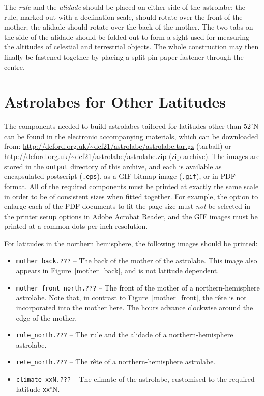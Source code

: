 \documentclass[a4paper,onecolumn,10pt]{article}
\begin{document}
The {\it rule} and the {\it alidade} should be placed on either side of the
astrolabe: the rule, marked out with a declination scale, should rotate over
the front of the mother; the alidade should rotate over the back of the mother.
The two tabs on the side of the alidade should be folded out to form a sight
used for measuring the altitudes of celestial and terrestrial objects.  The
whole construction may then finally be fastened together by placing a split-pin
paper fastener through the centre.

\section*{Astrolabes for Other Latitudes}

The components needed to build astrolabes tailored for latitudes other than
$52^\circ$N can be found in the electronic accompanying materials, which can be
downloaded from:
\newline\noindent\url{http://dcford.org.uk/~dcf21/astrolabe/astrolabe.tar.gz}
(tarball)
\newline\noindent or
\newline\noindent\url{http://dcford.org.uk/~dcf21/astrolabe/astrolabe.zip} (zip
archive).
\newline\noindent The images are stored in the {\tt output} directory of this
archive, and each is available as encapsulated postscript ({\tt .eps}), as a
GIF bitmap image ({\tt .gif}), or in PDF format.  All of the required
components must be printed at exactly the same scale in order to be of
consistent sizes when fitted together. For example, the option to enlarge each
of the PDF documents to fit the page size must {\it not} be selected in the
printer setup options in Adobe Acrobat Reader, and the GIF images must be
printed at a common dots-per-inch resolution.

For latitudes in the northern hemisphere, the following images should be
printed:
\begin{itemize}
\item {\tt mother\_back.???} -- The back of the mother of the astrolabe. This image also appears in Figure~\ref{mother_back}, and is not latitude dependent.
\item {\tt mother\_front\_north.???} -- The front of the mother of a northern-hemi\-sp\-here astrolabe. Note that, in contrast to Figure~\ref{mother_front}, the r\^ete is not incorporated into the mother here. The hours advance clockwise around the edge of the mother.
\item {\tt rule\_north.???} -- The rule and the alidade of a northern-hemisphere astrolabe.
\item {\tt rete\_north.???} -- The r\^ete of a northern-hemisphere astrolabe.
\item{\tt climate\_xxN.???} -- The climate of the astrolabe, customised to the required latitude {\tt xx}$^\circ$N.
\end{itemize}
\end{document}
